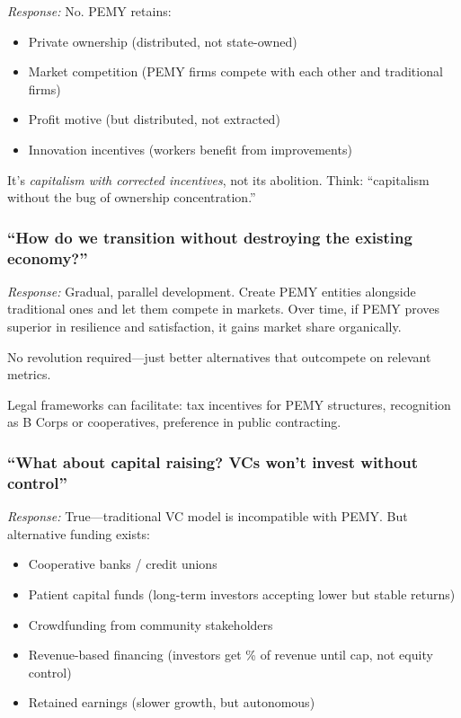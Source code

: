 \documentclass[11pt,a4paper]{article}
\theoremstyle{definition}
\theoremstyle{remark}
\begin{document}
\textit{Response:} No. PEMY retains:
\begin{itemize}
    \item Private ownership (distributed, not state-owned)
    \item Market competition (PEMY firms compete with each other and traditional firms)
    \item Profit motive (but distributed, not extracted)
    \item Innovation incentives (workers benefit from improvements)
\end{itemize}

It's \textit{capitalism with corrected incentives}, not its abolition. Think: ``capitalism without the bug of ownership concentration.''

\subsubsection{``How do we transition without destroying the existing economy?''}

\textit{Response:} Gradual, parallel development. Create PEMY entities alongside traditional ones and let them compete in markets. Over time, if PEMY proves superior in resilience and satisfaction, it gains market share organically.

No revolution required---just better alternatives that outcompete on relevant metrics.

Legal frameworks can facilitate: tax incentives for PEMY structures, recognition as B Corps or cooperatives, preference in public contracting.

\subsubsection{``What about capital raising? VCs won't invest without control''}

\textit{Response:} True---traditional VC model is incompatible with PEMY. But alternative funding exists:
\begin{itemize}
    \item Cooperative banks / credit unions
    \item Patient capital funds (long-term investors accepting lower but stable returns)
    \item Crowdfunding from community stakeholders
    \item Revenue-based financing (investors get \% of revenue until cap, not equity control)
    \item Retained earnings (slower growth, but autonomous)
\end{itemize}
\end{document}
